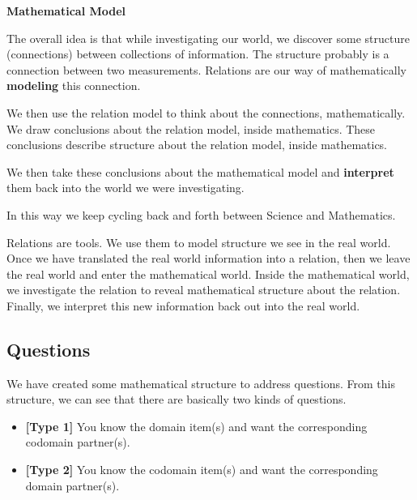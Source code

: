\documentclass{ximera}
\begin{document}
\begin{idea} \textbf{\textcolor{blue!55!black}{Mathematical Model}} 

The overall idea is that while investigating our world, we discover some structure (connections) between collections of information.  The structure probably is a connection between two measurements. Relations are our way of mathematically \textbf{\textcolor{blue!55!black}{modeling}} this connection.

We then use the relation model to think about the connections, mathematically.  We draw conclusions about the relation model, inside mathematics. These conclusions describe structure about the relation model, inside mathematics.

We then take these conclusions about the mathematical model and \textbf{\textcolor{purple!85!blue}{interpret}} them back into the world we were investigating.

In this way we keep cycling back and forth between Science and Mathematics.

\end{idea}

Relations are tools.  We use them to model structure we see in the real world. Once we have translated the real world information into a relation, then we leave the real world and enter the mathematical world. Inside the mathematical world, we investigate the relation to reveal mathematical structure about the relation.  Finally, we interpret this new information back out into the real world. 





\hfill\break


\subsection*{Questions}

\hfill\break

We have created some mathematical structure to address questions. From this structure, we can see that there are basically two kinds of questions.

\begin{itemize}
\item \textbf{\textcolor{blue!55!black}{[Type 1]}} You know the domain item(s) and want the corresponding codomain partner(s).
\item \textbf{\textcolor{blue!55!black}{[Type 2]}} You know the codomain item(s) and want the corresponding domain partner(s).
\end{itemize}
\end{document}
